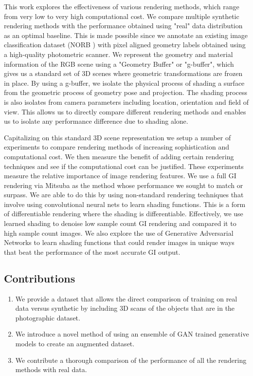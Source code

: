 \documentclass[10pt,twocolumn,letterpaper]{article}
\begin{document}
This work explores the effectiveness of various rendering methods, which range from very low to very high computational cost. We compare multiple synthetic rendering methods with the performance obtained using "real" data distribution as an optimal baseline. This is made possible since we annotate an existing image classification dataset (NORB \cite{LeCun:2004:LMG:1896300.1896315}) with pixel aligned geometry labels obtained using a high-quality photometric scanner. We represent the geometry and material information of the RGB scene using a "Geometry Buffer" or "g-buffer", which gives us a standard set of 3D scenes where geometric transformations are frozen in place. By using a g-buffer, we isolate the physical process of shading a surface from the geometric process of geometry pose and projection.  The shading process is also isolates from camera parameters including location, orientation and field of view. This allows us to directly compare different rendering methods and enables us to isolate any performance difference due to shading alone.

Capitalizing on this standard 3D scene representation we setup a number of experiments to compare rendering methods of increasing sophistication and computational cost.  We then measure the benefit of adding certain rendering techniques and see if the computational cost can be justified.  These experiments measure the relative importance of image rendering features. We use a full GI rendering via Mitsuba as the method whose performance we sought to match or surpass.
We are able to do this by using non-standard rendering techniques that involve using convolutional neural nets to learn shading functions.  This is a form of differentiable rendering where the shading is differentiable. Effectively, we use learned shading to denoise low sample count GI rendering and compared it to high sample count images.  We also explore the use of Generative Adversarial Networks to learn shading functions that could render images in unique ways that beat the performance of the most accurate GI output.
\subsection{Contributions}
\begin{enumerate}
\item We provide a dataset that allows the direct comparison of training on real data versus synthetic by including 3D scans of the objects that are in the photographic dataset.
\item We introduce a novel method of using an ensemble of GAN trained generative models to create an augmented dataset.
\item We contribute a thorough comparison of the performance of all the rendering methods with real data.
\end{enumerate}
\end{document}
